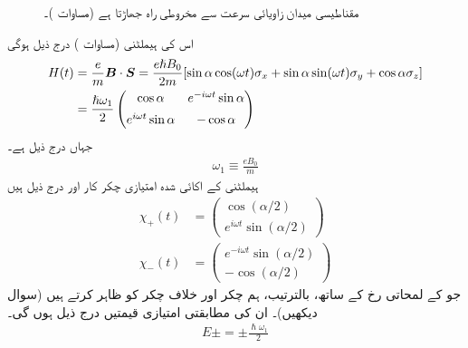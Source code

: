 \begin{figure}
\centering
{}
\caption
{مقناطیسی میدان زاویائی سرعت  سے مخروطی راہ جھاڑتا ہے (مساوات )۔ }
\label{شکل_حرارت_نا_گزر_مخروطی_راہ_جھاڑنا}
\end{figure}


اس کی ہیملٹنی (مساوات ) درج ذیل ہوگی
\begin{gather}
\begin{aligned}\label{مساوات_حر_مخصوص_ہیملٹنی}
H(t) &= \frac{e}{m} {{\boldsymbol{B}}} \cdot {\ensuremath{{\boldsymbol{S}}}} = \frac{e \hslash B_0}{2m} [\sin \alpha \cos(\omega t) \sigma_x + \sin \alpha \sin(\omega t) \sigma_y + \cos \alpha \sigma_z] \\
&= \frac{\hslash \omega_1}{2}
\begin{pmatrix}
\cos \alpha& e^{-i\omega t}\sin \alpha\\[0.5em]
e^{i\omega t}\sin\alpha& -\cos\alpha
\end{pmatrix} 
\end{aligned}
\end{gather}
جہاں  درج ذیل ہے۔
\begin{align}
\omega_1 \equiv \frac{e B_0}{m}
\end{align}
ہیملٹنی  کے اکائی شدہ امتیازی چکر کار  اور  درج ذیل ہیں
\begin{align}
\chi_+ (t) &= 
\begin{pmatrix}
\cos(\alpha/2) \\[0.5em]
e^{i \omega t} \sin(\alpha/2)
\end{pmatrix}\\
\chi_{-} (t) &= 
\begin{pmatrix}
e^{-i \omega t} \sin(\alpha/2) \\[0.5em]
- \cos(\alpha/2)
\end{pmatrix}
\end{align}
جو  کے لمحاتی رخ کے ساتھ، بالترتیب، ہم چکر اور خلاف چکر کو ظاہر کرتے ہیں (سوال  دیکھیں)۔ ان کی مطابقتی امتیازی قیمتیں درج ذیل ہوں گی۔
\begin{align}\label{مساوات_حر_حرکی_ہیّت_توانائی}
E \pm = \pm \frac{\hslash \omega_1}{2}
\end{align}

